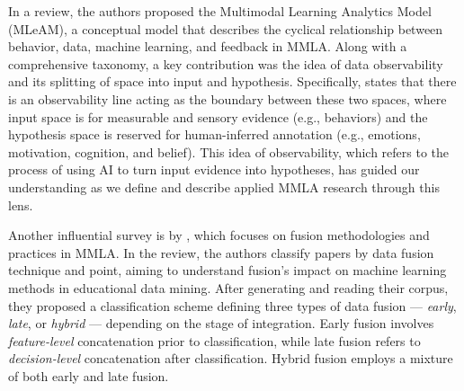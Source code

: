 \documentclass[manuscript,screen,review]{acmart}
\begin{document}
In a \citet{di_mitri_signals_2018} review, the authors proposed the Multimodal Learning Analytics Model (MLeAM), a conceptual model that describes the cyclical relationship between behavior, data, machine learning, and feedback in MMLA. Along with a comprehensive taxonomy, a key contribution was the idea of data observability and its splitting of space into input and hypothesis. Specifically, \citet{di_mitri_signals_2018} states that there is an observability line acting as the boundary between these two spaces, where input space is for measurable and sensory evidence (e.g., behaviors) and the hypothesis space is reserved for human-inferred annotation (e.g., emotions, motivation, cognition, and belief). This idea of observability, which refers to the process of using AI to turn input evidence into hypotheses, has guided our understanding as we define and describe applied MMLA research through this lens.

Another influential survey is by \citet{chango_review_2022}, which focuses on fusion methodologies and practices in MMLA. In the review, the authors classify papers by data fusion technique and point, aiming to understand fusion's impact on machine learning methods in educational data mining. After generating and reading their corpus, they proposed a classification scheme defining three types of data fusion --- \textit{early}, \textit{late}, or \textit{hybrid} --- depending on the stage of integration. Early fusion involves \textit{feature-level} concatenation prior to classification, while late fusion refers to \textit{decision-level} concatenation after classification. Hybrid fusion employs a mixture of both early and late fusion.
\end{document}
